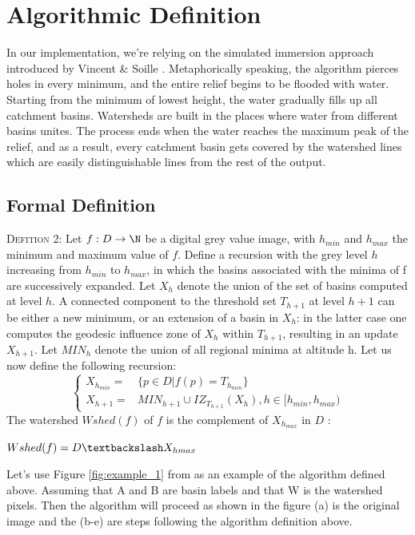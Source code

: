 \documentclass{article}
\begin{document}
\section{Algorithmic Definition}
\vspace{2mm}
In our implementation, we're relying on the simulated immersion approach introduced by Vincent \& Soille \cite{soilletextbook}. \newline\newline
Metaphorically speaking, the algorithm pierces holes in every minimum, and the entire relief begins to be flooded with water. Starting from the minimum of lowest height, the water gradually fills up all catchment basins. Watersheds are built in the places where water from different basins unites. The process ends when the water reaches the maximum peak of the relief, and as a result, every catchment basin gets covered by the watershed lines which are easily distinguishable lines from the rest of the output.
\subsection{Formal Definition}
\begin{tcolorbox}
\textsc{Defition 2:} \cite{parwshed} \newline\newline
Let $f : D \to \N$ be a digital grey value image, with $h_{min}$ and $h_{max}$ the minimum and maximum value of $f$. Define a recursion with the grey level $h$ increasing from $h_{min}$ to $h_{max}$, in which the basins associated with the minima of f are successively expanded. Let $X_h$ denote the union of the set of basins computed at level $h$. A connected component to the threshold set $T_{h + 1}$ at level $h + 1$ can be either a new minimum, or an extension of a basin in $X_h$: in the latter case one computes the geodesic influence zone of $X_h$ within $T_{h+1}$, resulting in an update $X_{h+1}$. Let $MIN_h$ denote the union of all regional minima at altitude h.\newline\newline
Let us now define the following recursion: \newline
\[
\begin{cases}
    X_{h_{min}} = & \{p \in D | f(p) = T_{h_{min}}\}\\
    X_{h+1} = & MIN_{h+1} \cup IZ_{T_{h+1}}\left(X_h\right), h \in [h_{min}, h_{max})
\end{cases}
\]
\newline\newline
The watershed $Wshed(f)$ of $f$ is the complement of $X_{h_{max}}$ in $D$ : 
\begin{center}
    $Wshed(f) = D \textbackslash X_{h{max}}$
\end{center}
\end{tcolorbox}
\vspace{2mm}
Let's use Figure \ref{fig:example_1} from \cite{parwshed} as an example of the algorithm defined above. Assuming that A and B are basin labels and that W is the watershed pixels. Then the algorithm will proceed as shown in the figure (a) is the original image and the (b-e) are steps following the algorithm definition above.
\end{document}
